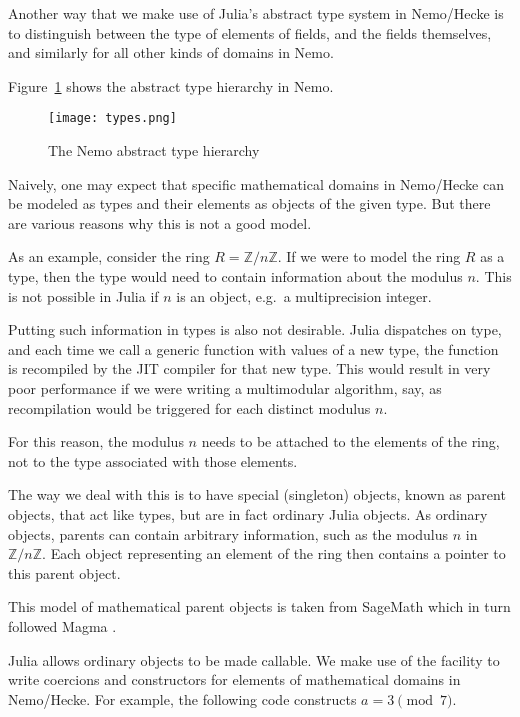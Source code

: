 \documentclass{sig-alternate-05-2015}
\begin{document}
Another way that we make use of Julia's abstract type system in Nemo/Hecke is to distinguish
between the type of elements of fields, and the fields themselves, and similarly for all other
kinds of domains in Nemo. 

Figure~\ref{fig:types} shows the abstract type hierarchy in Nemo.

\begin{figure}[h]
\centering
\texttt{[image: types.png]}
\caption{The Nemo abstract type hierarchy}
\label{fig:types}
\end{figure}

Naively, one may expect that specific mathematical domains in Nemo/Hecke can be modeled as types
and their elements as objects of the given type. But there are various reasons why this is not a
good model.

As an example, consider the ring $R = \mathbb{Z}/n\mathbb{Z}$. If we were to model the ring $R$
as a type, then the type would need to contain information about the modulus $n$. This is not
possible in Julia if $n$ is an object, e.g.\ a multiprecision integer.

Putting such information in types is also not desirable. Julia dispatches on type, and each time
we call a generic function with values of a new type, the function is recompiled by the
JIT compiler for that new type. This would result in very poor performance if we were writing a
multimodular algorithm, say, as recompilation would be triggered for each distinct modulus $n$.

For this reason, the modulus $n$ needs to be attached to the elements of the ring, not to the type
associated with those elements.

The way we deal with this is to have special (singleton) objects, known as parent objects, that act
like types, but are in fact ordinary Julia objects. As ordinary objects, parents can contain
arbitrary information, such as the modulus $n$ in $\mathbb{Z}/n\mathbb{Z}$. Each object representing
an element of the ring then contains a pointer to this parent object.

This model of mathematical parent objects is taken from SageMath \cite{sage} which in turn followed
Magma \cite{magma}.

Julia allows ordinary objects to be made callable. We make use of the facility to write coercions
and constructors for elements of mathematical domains in Nemo/Hecke. For example, the following
code constructs $a = 3 \pmod{7}$.
\end{document}

